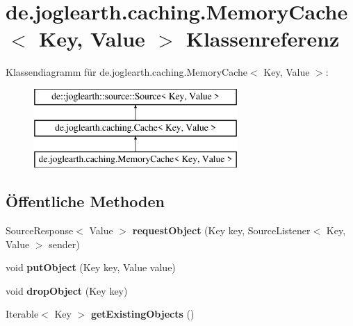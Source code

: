 \section{de.\-joglearth.\-caching.\-Memory\-Cache$<$ Key, Value $>$ Klassenreferenz}
\label{classde_1_1joglearth_1_1caching_1_1_memory_cache_3_01_key_00_01_value_01_4}
Klassendiagramm für de.\-joglearth.\-caching.\-Memory\-Cache$<$ Key, Value $>$\-:\begin{figure}[H]
\begin{center}
\leavevmode
\includegraphics[height=3.000000cm]{classde_1_1joglearth_1_1caching_1_1_memory_cache_3_01_key_00_01_value_01_4}
\end{center}
\end{figure}
\subsection*{Öffentliche Methoden}
\begin{DoxyCompactItemize}
\item 
Source\-Response$<$ Value $>$ {\bfseries request\-Object} (Key key, Source\-Listener$<$ Key, Value $>$ sender)\label{classde_1_1joglearth_1_1caching_1_1_memory_cache_3_01_key_00_01_value_01_4_a21c160a186d8c8c2606a0ddc4ef6f220}

\item 
void {\bfseries put\-Object} (Key key, Value value)\label{classde_1_1joglearth_1_1caching_1_1_memory_cache_3_01_key_00_01_value_01_4_aae40ac332dfe8e2e6bca56652a793f75}

\item 
void {\bfseries drop\-Object} (Key key)\label{classde_1_1joglearth_1_1caching_1_1_memory_cache_3_01_key_00_01_value_01_4_a1e7ac34212abfc70652a8d8b8de78f37}

\item 
Iterable$<$ Key $>$ {\bfseries get\-Existing\-Objects} ()\label{classde_1_1joglearth_1_1caching_1_1_memory_cache_3_01_key_00_01_value_01_4_a7bcc89346baa38b5665066d145c570cb}

\end{DoxyCompactItemize}
